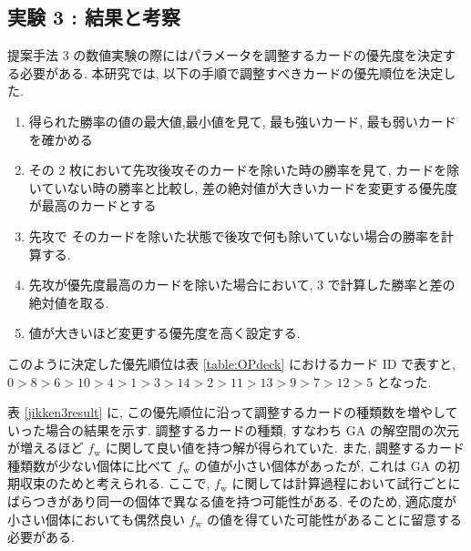 \documentclass[twocolumn]{jarticle}
\begin{document}
               \subsection{実験 3 : 結果と考察}
               提案手法 3 の数値実験の際にはパラメータを調整するカードの優先度を決定する必要がある.
               本研究では, 以下の手順で調整すべきカードの優先順位を決定した. 
               \begin{enumerate}
                  \small
                  \setlength{\itemsep}{0cm} %
                 \item 得られた勝率の値の最大値,最小値を見て, 最も強いカード, 最も弱いカードを確かめる
                 \item その 2 枚において先攻後攻そのカードを除いた時の勝率を見て, カードを除いていない時の勝率と比較し, 差の絶対値が大きいカードを変更する優先度が最高のカードとする
                 \item 先攻で そのカードを除いた状態で後攻で何も除いていない場合の勝率を計算する.
                 \item 先攻が優先度最高のカードを除いた場合において, 3 で計算した勝率と差の絶対値を取る. 
                 \item 値が大きいほど変更する優先度を高く設定する.
               \end{enumerate}
               このように決定した優先順位は表 \ref{table:OPdeck} におけるカード ID で表すと, 
               $0 > 8 > 6 > 10 > 4 > 1 > 3 > 14 > 2 > 11 > 13 > 9 > 7 > 12 > 5$ となった. \par
               表 \ref{jikken3result} に, この優先順位に沿って調整するカードの種類数を増やしていった場合の結果を示す.
               調整するカードの種類, すなわち GA の解空間の次元が増えるほど $f_\mathrm{w}$ に関して良い値を持つ解が得られていた. また, 調整するカード種類数が少ない個体に比べて $f_\mathrm{w}$ の値が小さい個体があったが, これは GA の初期収束のためと考えられる. ここで, $f_\mathrm{w}$ に関しては計算過程において試行ごとにばらつきがあり同一の個体で異なる値を持つ可能性がある. そのため, 適応度が小さい個体においても偶然良い $f_\mathrm{w}$ の値を得ていた可能性があることに留意する必要がある. \par
\end{document}
